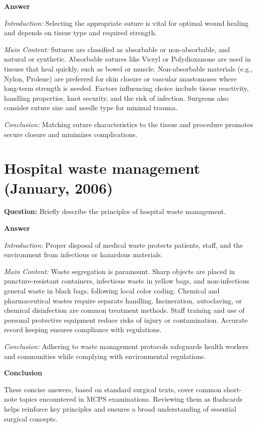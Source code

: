 \documentclass{article}
\begin{document}
\textbf{Answer}

\emph{Introduction:} Selecting the appropriate suture is vital for optimal wound healing and depends on tissue type and required strength.

\emph{Main Content:} Sutures are classified as absorbable or non-absorbable, and natural or synthetic. Absorbable sutures like Vicryl or Polydioxanone are used in tissues that heal quickly, such as bowel or muscle. Non-absorbable materials (e.g., Nylon, Prolene) are preferred for skin closure or vascular anastomoses where long-term strength is needed. Factors influencing choice include tissue reactivity, handling properties, knot security, and the risk of infection. Surgeons also consider suture size and needle type for minimal trauma.

\emph{Conclusion:} Matching suture characteristics to the tissue and procedure promotes secure closure and minimizes complications.


\section{Hospital waste management (January, 2006)}


\textbf{Question:} Briefly describe the principles of hospital waste management.

\textbf{Answer}

\emph{Introduction:} Proper disposal of medical waste protects patients, staff, and the environment from infectious or hazardous materials.

\emph{Main Content:} Waste segregation is paramount. Sharp objects are placed in puncture-resistant containers, infectious waste in yellow bags, and non-infectious general waste in black bags, following local color coding. Chemical and pharmaceutical wastes require separate handling. Incineration, autoclaving, or chemical disinfection are common treatment methods. Staff training and use of personal protective equipment reduce risks of injury or contamination. Accurate record keeping ensures compliance with regulations.

\emph{Conclusion:} Adhering to waste management protocols safeguards health workers and communities while complying with environmental regulations.


\textbf{Conclusion}

These concise answers, based on standard surgical texts, cover common short-note topics encountered in MCPS examinations. Reviewing them as flashcards helps reinforce key principles and ensures a broad understanding of essential surgical concepts.
\end{document}
